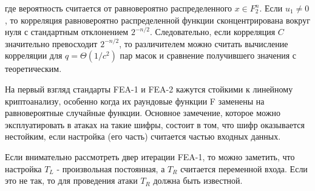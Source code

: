 \documentclass[utf8x, 14pt]{G7-32} %
\begin{document}
где вероятность считается от равновероятно распределенного $x\in F_2^n$. Если $u_1 \neq 0$, то корреляция равновероятно распределенной функции сконцентрирована вокруг нуля с стандартным отклонением $2^{-n/2}$. Следовательно, если корреляция $C$ значительно превосходит $2^{-n/2}$, то различителем можно считать вычисление корреляции для $q=\Theta (1/c^2)$ пар масок и сравнение получившего значения с теоретическим.

На первый взгляд стандарты FEA-1 и FEA-2 кажутся стойкими к линейному криптоанализу, особенно когда их раундовые функции F заменены на равновероятные случайные функции. Основное замечение, которое можно эксплуатировать в атаках на такие шифры, состоит в том, что шифр оказывается нестойким, если настройка (его часть) считается частью входных данных.

Если внимательно рассмотреть двер итерации FEA-1, то можно заметить, что настройка $T_L$ - произвольная постоянная, а $T_R$ считается переменной входа. Если это не так, то для проведения атаки $T_R$ должна быть известной.





\backmatter %





%

%
\end{document}
